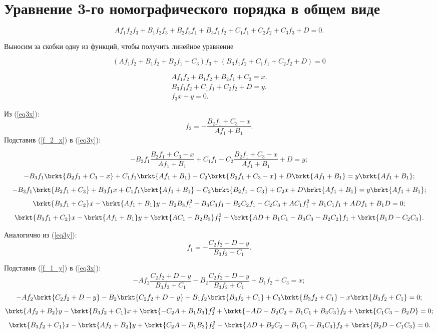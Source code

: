 \section{Уравнение 3-го номографического порядка в общем виде}

\begin{equation}\label{eq3full}
A f_1 f_2 f_3 + B_1 f_2 f_3 + B_2 f_3 f_1 + B_3 f_1 f_2 + C_1 f_1 + C_2 f_2 + C_3 f_3 + D = 0.
\end{equation}

Выносим за скобки одну из функций, чтобы получить линейное уравнение

$$
	\left (
		A f_1 f_2
		+B_1 f_2
		+B_2 f_1 
		+C_3 
	\right ) f_3
	+\left (
		B_3 f_1 f_2 
		+C_1 f_1 
		+C_2 f_2 
		+D 
	\right )
= 0$$

\begin{eqnarray}
	A f_1 f_2
	+B_1 f_2
	+B_2 f_1 
	+C_3 
	= x.\label{eq3x}\\
	B_3 f_1 f_2 
	+C_1 f_1 
	+C_2 f_2 
	+D 
	= y.\label{eq3y}\\
	f_3 x + y = 0.\label{eq3line}
\end{eqnarray}

Из (\ref{eq3x}):
\begin{equation}\label{f_2_x}
	f_2 = - \frac{B_2 f_1 + C_3 - x}{Af_1 + B_1}.
\end{equation}
Подставив (\ref{f_2_x}) в (\ref{eq3y}):

$$-B_3 f_1 \frac{B_2 f_1 + C_3 - x}{Af_1 + B_1}
+ C_1 f_1 - C_2 \frac{B_2 f_1 + C_3 - x}{Af_1 + B_1} + D = y;$$
$$-B_3 f_1 \brkt{B_2 f_1 + C_3 - x}
+ C_1 f_1 \brkt{Af_1 + B_1} - C_2 \brkt{B_2 f_1 + C_3 - x} + D\brkt{Af_1 + B_1} 
= y\brkt{Af_1 + B_1};$$
$$-B_3 f_1 \brkt{B_2 f_1 + C_3} + B_3 f_1 x
+ C_1 f_1 \brkt{A f_1 + B_1} 
- C_2 \brkt{B_2 f_1 + C_3} + C_2 x
+ D\brkt{Af_1 + B_1} 
= y\brkt{Af_1 + B_1};$$
$$\brkt{B_3 f_1 + C_2} x
- \brkt{Af_1 + B_1}y
- B_2 B_3 f_1^2 - B_3 C_3 f_1
- B_2 C_2 f_1 - C_2 C_3 
+ A C_1 f_1^2 + B_1 C_1 f_1
+ A D f_1 + B_1 D
= 0;$$
\begin{equation}
\brkt{B_3 f_1 + C_2} x
- \brkt{Af_1 + B_1}y
+ \brkt{A C_1 - B_2 B_3} f_1^2 
+ \brkt{
A D
+ B_1 C_1
- B_3 C_3
- B_2 C_2 
} f_1 
+ \brkt{B_1 D
- C_2 C_3}.
\end{equation}

Аналогично из (\ref{eq3y}):
\begin{equation}\label{f_1_y}
	f_1 = - \frac{C_2 f_2 + D - y}{B_3 f_2 + C_1}.
\end{equation}

Подставив (\ref{f_1_y}) в (\ref{eq3x}):
$$
- A f_2 \frac{C_2 f_2 + D - y}{B_3 f_2 + C_1}
- B_2 \frac{C_2 f_2 + D - y}{B_3 f_2 + C_1}
+ B_1 f_2
+ C_3 
= x;
$$
$$
- A f_2 \brkt{C_2 f_2 + D - y}
- B_2 \brkt{C_2 f_2 + D - y}
+ B_1 f_2\brkt{B_3 f_2 + C_1}
+ C_3 \brkt{B_3 f_2 + C_1}
- x\brkt{B_3 f_2 + C_1}
= 0;
$$
$$
\brkt{A f_2 + B_2} y
- \brkt{B_3 f_2 + C_1}x
+ \brkt{
- C_2 A 
+ B_1 B_3
}f_2^2 
+ \brkt{
- A D 
- B_2 C_2 
+ B_1 C_1
+ B_3 C_3 
} f_2
+ \brkt{C_1 C_3 - B_2 D}
= 0;
$$
\begin{equation}
\brkt{B_3 f_2 + C_1}x
- \brkt{A f_2 + B_2} y
+ \brkt{ C_2 A - B_1 B_3 }f_2^2 
+ \brkt{A D + B_2 C_2 - B_1 C_1 - B_3 C_3 } f_2
+ \brkt{B_2 D - C_1 C_3}
= 0.
\end{equation}

